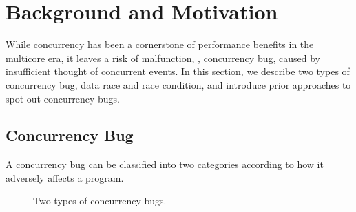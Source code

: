 \section{Background and Motivation}
\label{s:background}

While concurrency has been a cornerstone of performance benefits in
the multicore era, it leaves a risk of malfunction, \ie, concurrency
bug, caused by insufficient thought of concurrent events.
%
In this section, we describe two types of concurrency bug, data race
and race condition, and introduce prior approaches to spot out
concurrency bugs.

\subsection{Concurrency Bug}
\label{ss:concurrencybugs}

A concurrency bug can be classified into two categories according to
how it adversely affects a program.

\begin{figure}
  \centering
  \hfill
  \caption{Two types of concurrency bugs.}
  \label{fig:concurrencybugs}
\end{figure}  


